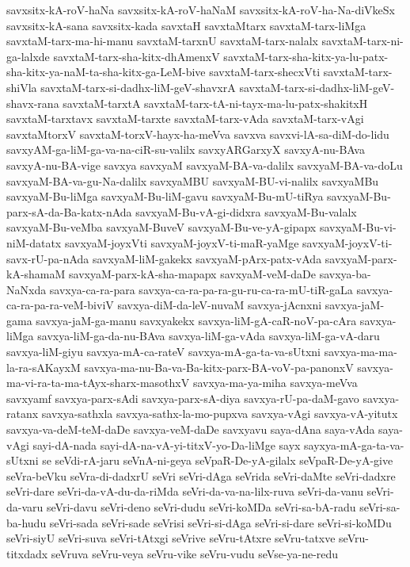 {savxsitx-kA-roV-haNa
savxsitx-kA-roV-haNaM
savxsitx-kA-roV-ha-Na-diVkeSx
savxsitx-kA-sana
savxsitx-kada
savxtaH
savxtaMtarx
savxtaM-tarx-liMga
savxtaM-tarx-ma-hi-manu
savxtaM-tarxnU
savxtaM-tarx-nalalx
savxtaM-tarx-ni-ga-lalxde
savxtaM-tarx-sha-kitx-dhAmenxV
savxtaM-tarx-sha-kitx-ya-lu-patx-sha-kitx-ya-naM-ta-sha-kitx-ga-LeM-bive
savxtaM-tarx-shecxVti
savxtaM-tarx-shiVla
savxtaM-tarx-si-dadhx-liM-geV-shavxrA
savxtaM-tarx-si-dadhx-liM-geV-shavx-rana
savxtaM-tarxtA
savxtaM-tarx-tA-ni-tayx-ma-lu-patx-shakitxH
savxtaM-tarxtavx
savxtaM-tarxte
savxtaM-tarx-vAda
savxtaM-tarx-vAgi
savxtaMtorxV
savxtaM-torxV-hayx-ha-meVva
savxva
savxvi-lA-sa-diM-do-lidu
savxyAM-ga-liM-ga-va-na-ciR-su-valilx
savxyARGarxyX
savxyA-nu-BAva
savxyA-nu-BA-vige
savxya
savxyaM
savxyaM-BA-va-dalilx
savxyaM-BA-va-doLu
savxyaM-BA-va-gu-Na-dalilx
savxyaMBU
savxyaM-BU-vi-nalilx
savxyaMBu
savxyaM-Bu-liMga
savxyaM-Bu-liM-gavu
savxyaM-Bu-mU-tiRya
savxyaM-Bu-parx-sA-da-Ba-katx-nAda
savxyaM-Bu-vA-gi-didxra
savxyaM-Bu-valalx
savxyaM-Bu-veMba
savxyaM-BuveV
savxyaM-Bu-ve-yA-gipapx
savxyaM-Bu-vi-niM-datatx
savxyaM-joyxVti
savxyaM-joyxV-ti-maR-yaMge
savxyaM-joyxV-ti-savx-rU-pa-nAda
savxyaM-liM-gakekx
savxyaM-pArx-patx-vAda
savxyaM-parx-kA-shamaM
savxyaM-parx-kA-sha-mapapx
savxyaM-veM-daDe
savxya-ba-NaNxda
savxya-ca-ra-para
savxya-ca-ra-pa-ra-gu-ru-ca-ra-mU-tiR-gaLa
savxya-ca-ra-pa-ra-veM-biviV
savxya-diM-da-leV-nuvaM
savxya-jAcnxni
savxya-jaM-gama
savxya-jaM-ga-manu
savxyakekx
savxya-liM-gA-caR-noV-pa-cAra
savxya-liMga
savxya-liM-ga-da-nu-BAva
savxya-liM-ga-vAda
savxya-liM-ga-vA-daru
savxya-liM-giyu
savxya-mA-ca-rateV
savxya-mA-ga-ta-va-sUtxni
savxya-ma-ma-la-ra-sAKayxM
savxya-ma-nu-Ba-va-Ba-kitx-parx-BA-voV-pa-panonxV
savxya-ma-vi-ra-ta-ma-tAyx-sharx-masothxV
savxya-ma-ya-miha
savxya-meVva
savxyamf
savxya-parx-sAdi
savxya-parx-sA-diya
savxya-rU-pa-daM-gavo
savxya-ratanx
savxya-sathxla
savxya-sathx-la-mo-pupxva
savxya-vAgi
savxya-vA-yitutx
savxya-va-deM-teM-daDe
savxya-veM-daDe
savxyavu
saya-dAna
saya-vAda
saya-vAgi
sayi-dA-nada
sayi-dA-na-vA-yi-titxV-yo-Da-liMge
sayx
sayxya-mA-ga-ta-va-sUtxni
se
seVdi-rA-jaru
seVnA-ni-geya
seVpaR-De-yA-gilalx
seVpaR-De-yA-give
seVra-beVku
seVra-di-dadxrU
seVri
seVri-dAga
seVrida
seVri-daMte
seVri-dadxre
seVri-dare
seVri-da-vA-du-da-riMda
seVri-da-va-na-lilx-ruva
seVri-da-vanu
seVri-da-varu
seVri-davu
seVri-deno
seVri-dudu
seVri-koMDa
seVri-sa-bA-radu
seVri-sa-ba-hudu
seVri-sada
seVri-sade
seVrisi
seVri-si-dAga
seVri-si-dare
seVri-si-koMDu
seVri-siyU
seVri-suva
seVri-tAtxgi
seVrive
seVru-tAtxre
seVru-tatxve
seVru-titxdadx
seVruva
seVru-veya
seVru-vike
seVru-vudu
seVse-ya-ne-redu
}
